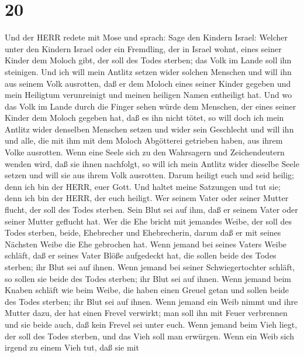 \hypertarget{section-19}{%
\section{20}\label{section-19}}

 Und der HERR redete mit Mose und sprach:  Sage
den Kindern Israel: Welcher unter den Kindern Israel oder ein Fremdling,
der in Israel wohnt, eines seiner Kinder dem Moloch gibt, der soll des
Todes sterben; das Volk im Lande soll ihn steinigen.  Und
ich will mein Antlitz setzen wider solchen Menschen und will ihn aus
seinem Volk ausrotten, daß er dem Moloch eines seiner Kinder gegeben und
mein Heiligtum verunreinigt und meinen heiligen Namen entheiligt hat.
 Und wo das Volk im Lande durch die Finger sehen würde dem
Menschen, der eines seiner Kinder dem Moloch gegeben hat, daß es ihn
nicht tötet,  so will doch ich mein Antlitz wider denselben
Menschen setzen und wider sein Geschlecht und will ihn und alle, die mit
ihm mit dem Moloch Abgötterei getrieben haben, aus ihrem Volke
ausrotten.  Wenn eine Seele sich zu den Wahrsagern und
Zeichendeutern wenden wird, daß sie ihnen nachfolgt, so will ich mein
Antlitz wider dieselbe Seele setzen und will sie aus ihrem Volk
ausrotten.  Darum heiligt euch und seid heilig; denn ich bin
der HERR, euer Gott.  Und haltet meine Satzungen und tut
sie; denn ich bin der HERR, der euch heiligt.  Wer seinem
Vater oder seiner Mutter flucht, der soll des Todes sterben. Sein Blut
sei auf ihm, daß er seinem Vater oder seiner Mutter geflucht hat.
 Wer die Ehe bricht mit jemandes Weibe, der soll des Todes
sterben, beide, Ehebrecher und Ehebrecherin, darum daß er mit seines
Nächsten Weibe die Ehe gebrochen hat.  Wenn jemand bei
seines Vaters Weibe schläft, daß er seines Vater Blöße aufgedeckt hat,
die sollen beide des Todes sterben; ihr Blut sei auf ihnen.
 Wenn jemand bei seiner Schwiegertochter schläft, so sollen
sie beide des Todes sterben; ihr Blut sei auf ihnen.  Wenn
jemand beim Knaben schläft wie beim Weibe, die haben einen Greuel getan
und sollen beide des Todes sterben; ihr Blut sei auf ihnen.
 Wenn jemand ein Weib nimmt und ihre Mutter dazu, der hat
einen Frevel verwirkt; man soll ihn mit Feuer verbrennen und sie beide
auch, daß kein Frevel sei unter euch.  Wenn jemand beim
Vieh liegt, der soll des Todes sterben, und das Vieh soll man erwürgen.
 Wenn ein Weib sich irgend zu einem Vieh tut, daß sie mit
